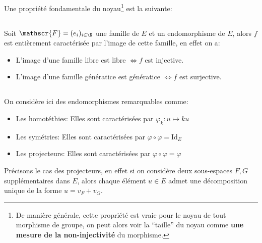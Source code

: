 Une propriété fondamentale du noyau\footnote[6]{De manière générale, cette propriété est vraie pour le noyau de tout morphisme de groupe, on peut alors voir la ``taille'' du noyau comme \textbf{une mesure de la non-injectivité} du morphisme.} est la suivante:
\pagebreak

\subsection*{}

Soit \(\mathscr{F} = (e_i)_{i \in \N}\) une famille de \(E\) et un endomorphisme de \(E\), alors \(f\) est entièrement caractérisée par l'image de cette famille, en effet on a:
\begin{itemize}
   \item L'image d'une famille libre est libre \(\Longleftrightarrow f\) est injective.
   \item L'image d'une famille génératice est génératice \(\Longleftrightarrow f\) est surjective.      
\end{itemize}

\subsection*{}

On considère ici des endomorphismes remarquables comme:
\begin{itemize}
   \item Les homotéthies: Elles sont caractérisées par \(\varphi_k : u \longmapsto ku\)
   \item Les symétries: Elles sont caractérisées par \(\varphi \circ \varphi = \text{Id}_E\)
   \item Les projecteurs: Elles sont caractérisées par \(\varphi \circ \varphi = \varphi\)
\end{itemize}
Précisons le cas des projecteurs, en effet si on considère deux sous-espaces \(F, G\) supplémentaires dans \(E\), alors chaque élément \(u \in E\) admet une décomposition unique de la forme \(u = v_F + v_G\).\<

